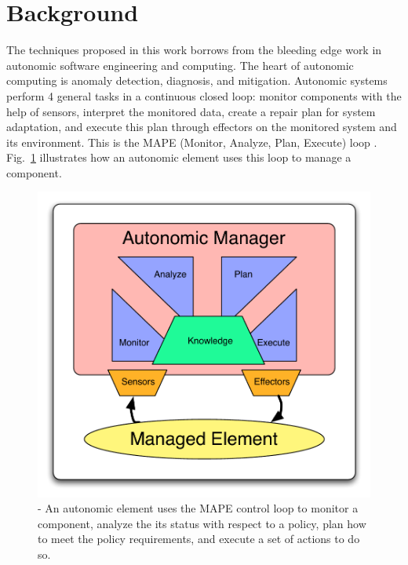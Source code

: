 \section{Background}
\label{sec:background}

The techniques proposed in this work borrows from the bleeding edge work in autonomic software engineering and computing.  The heart of autonomic computing is anomaly detection, diagnosis, and mitigation. Autonomic systems perform 4 general tasks in a continuous closed loop: monitor components with the help of sensors, interpret the monitored data, create a repair plan for system adaptation, and execute this plan through effectors on the monitored system and its environment. This is the MAPE (Monitor, Analyze, Plan, Execute) loop \cite{1160055}. Fig.~\ref{fig:mape} illustrates how an autonomic element uses this loop to manage a component.

\begin{figure}[tb]
  \centering
  \includegraphics[width=\columnwidth]{images/mape}
  \caption{-  An autonomic element uses the MAPE control loop to monitor a component, analyze the its status with respect to a policy, plan how to meet the policy requirements, and execute a set of actions to do so.}
	\label{fig:mape}
\end{figure}

